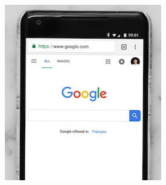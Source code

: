\documentclass[]{beamer}
\begin{document}
\begin{frame}
\begin{columns}
\begin{column}{0.2\textwidth}
{\begin{figure}
\includegraphics[width=\columnwidth]{screenshots/chromemobile.jpg}
\end{figure}}
\end{column}
\begin{column}{0.2\textwidth}
\end{column}
\end{columns}
\end{frame}
\end{document}

